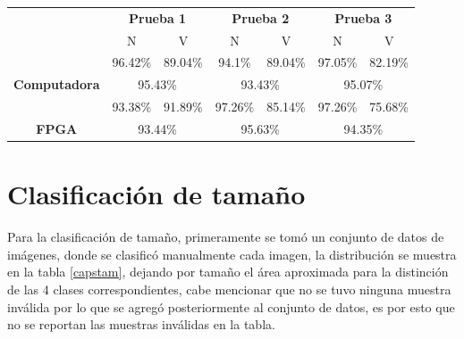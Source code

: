 \documentclass[twoside,spanish,ESP,MSc]{plantillaLabUPV}
\theoremstyle{definition}
\begin{document}
\begin{table}[!tbh]
\begin{tabular}{c|c|c|c|c|c|c|}
	\cline{2-7}
	& \multicolumn{2}{c|}{\textbf{Prueba 1}}              & \multicolumn{2}{c|}{\textbf{Prueba 2}}              & \multicolumn{2}{c|}{\textbf{Prueba 3}}              \\ \cline{2-7} 
	& {\color[HTML]{F56B00} N} & {\color[HTML]{009901} V} & {\color[HTML]{F56B00} N} & {\color[HTML]{009901} V} & {\color[HTML]{F56B00} N} & {\color[HTML]{009901} V} \\ \hline
	\multicolumn{1}{|c|}{}                                       & 96.42\%                  & 89.04\%                  & 94.1\%                   & 89.04\%                  & 97.05\%                  & 82.19\%                  \\ \cline{2-7} 
	\multicolumn{1}{|c|}{\multirow{-2}{*}{\textbf{Computadora}}} & \multicolumn{2}{c|}{95.43\%}                        & \multicolumn{2}{c|}{93.43\%}                        & \multicolumn{2}{c|}{95.07\%}                        \\ \hline
	\multicolumn{1}{|c|}{}                                       & 93.38\%                  & 91.89\%                  & 97.26\%                  & 85.14\%                  & 97.26\%                  & 75.68\%                  \\ \cline{2-7} 
	\multicolumn{1}{|c|}{\multirow{-2}{*}{\textbf{FPGA}}}        & \multicolumn{2}{c|}{93.44\%}                        & \multicolumn{2}{c|}{95.63\%}                        & \multicolumn{2}{c|}{94.35\%}                        \\ \hline
\end{tabular}
\end{table}


\section{Clasificación de tamaño}

Para la clasificación de tamaño, primeramente se tomó un conjunto de datos de imágenes, donde se clasificó manualmente cada imagen, la distribución se muestra en la tabla \ref{capstam}, dejando por tamaño el área aproximada para la distinción de las 4 clases correspondientes, cabe mencionar que no se tuvo ninguna muestra inválida por lo que se agregó posteriormente al conjunto de datos, es por esto que no se reportan las muestras inválidas en la tabla.
\end{document}
